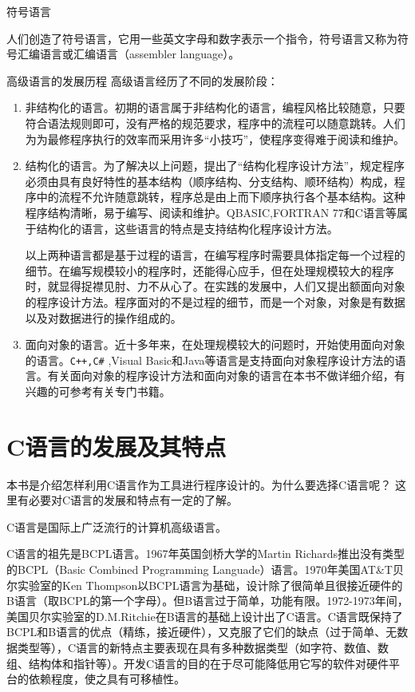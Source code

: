 符号语言

人们创造了符号语言，它用一些英文字母和数字表示一个指令，符号语言又称为符号汇编语言或汇编语言（assembler language）。

高级语言的发展历程
高级语言经历了不同的发展阶段：
\begin{enumerate}
	\item 非结构化的语言。初期的语言属于非结构化的语言，编程风格比较随意，只要符合语法规则即可，没有严格的规范要求，程序中的流程可以随意跳转。人们为为最修程序执行的效率而采用许多“小技巧”，使程序变得难于阅读和维护。
	\item 结构化的语言。为了解决以上问题，提出了“结构化程序设计方法”，规定程序必须由具有良好特性的基本结构（顺序结构、分支结构、顺环结构）构成，程序中的流程不允许随意跳转，程序总是由上而下顺序执行各个基本结构。这种程序结构清晰，易于编写、阅读和维护。QBASIC,FORTRAN 77和C语言等属于结构化的语言，这些语言的特点是支持结构化程序设计方法。

以上两种语言都是基于过程的语言，在编写程序时需要具体指定每一个过程的细节。在编写规模较小的程序时，还能得心应手，但在处理规模较大的程序时，就显得捉襟见肘、力不从心了。在实践的发展中，人们又提出额面向对象的程序设计方法。程序面对的不是过程的细节，而是一个对象，对象是有数据以及对数据进行的操作组成的。
	\item 面向对象的语言。近十多年来，在处理规模较大的问题时，开始使用面向对象的语言。\verb|C++,C#| ,Visual Basic和Java等语言是支持面向对象程序设计方法的语言。有关面向对象的程序设计方法和面向对象的语言在本书不做详细介绍，有兴趣的可参考有关专门书籍。
\end{enumerate}

\section{C语言的发展及其特点}

本书是介绍怎样利用C语言作为工具进行程序设计的。为什么要选择C语言呢？ 这里有必要对C语言的发展和特点有一定的了解。

C语言是国际上广泛流行的计算机高级语言。

C语言的祖先是BCPL语言。1967年英国剑桥大学的Martin Richards推出没有类型的BCPL（Basic Combined Programming Languade）语言。1970年美国AT\&T贝尔实验室的Ken Thompson以BCPL语言为基础，设计除了很简单且很接近硬件的B语言（取BCPL的第一个字母）。但B语言过于简单，功能有限。1972-1973年间，美国贝尔实验室的D.M.Ritchie在B语言的基础上设计出了C语言。C语言既保持了BCPL和B语言的优点（精练，接近硬件），又克服了它们的缺点（过于简单、无数据类型等），C语言的新特点主要表现在具有多种数据类型（如字符、数值、数组、结构体和指针等）。开发C语言的目的在于尽可能降低用它写的软件对硬件平台的依赖程度，使之具有可移植性。

